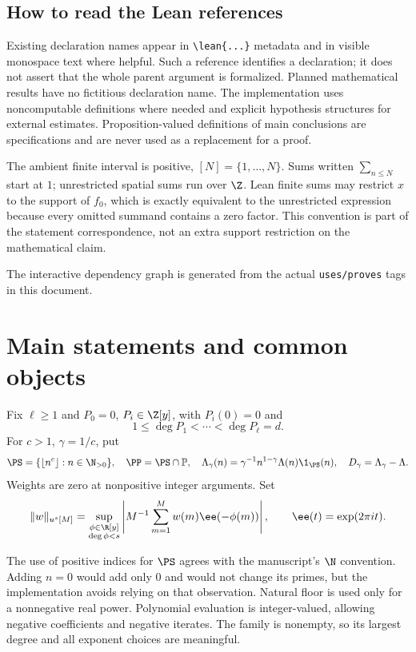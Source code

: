 \subsection*{How to read the Lean references}
Existing declaration names appear in \verb|\lean{...}| metadata and in visible monospace text where helpful. Such a reference identifies a declaration; it does not assert that the whole parent argument is formalized. Planned mathematical results have no fictitious declaration name. The implementation uses noncomputable definitions where needed and explicit hypothesis structures for external estimates. Proposition-valued definitions of main conclusions are specifications and are never used as a replacement for a proof.

The ambient finite interval is positive, $[N]=\{1,\ldots,N\}$. Sums written $\sum_{n\leq N}$ start at $1$; unrestricted spatial sums run over $\Z$. Lean finite sums may restrict $x$ to the support of $f_0$, which is exactly equivalent to the unrestricted expression because every omitted summand contains a zero factor. This convention is part of the statement correspondence, not an extra support restriction on the mathematical claim.
\fi

\ifdefined\WebVersion
The interactive dependency graph is generated from the actual \texttt{uses/proves} tags in this document.\else\fi

\section{Main statements and common objects}
\begin{definition}\label{def:objects}
Fix $\ell\geq1$ and $P_0=0$, $P_i\in\Z[y]$, with $P_i(0)=0$ and
\[
 1\leq\deg P_1<\cdots<\deg P_\ell=d.
\]
For $c>1$, $\gamma=1/c$, put
\[
 \PS=\{\lfloor n^c\rfloor:n\in\N_{>0}\},\quad
 \PP=\PS\cap\mathbb P,\quad
 \Lambda_\gamma(n)=\gamma^{-1}n^{1-\gamma}\Lambda(n)\1_{\PS}(n),\quad
 D_\gamma=\Lambda_\gamma-\Lambda.
\]
Weights are zero at nonpositive integer arguments. Set
\[
 \|w\|_{u^s[M]}=
 \sup_{\substack{\phi\in\R[y]\\\deg\phi<s}}
 \left|M^{-1}\sum_{m=1}^M w(m)\ee(-\phi(m))\right|,
 \qquad\ee(t)=\exp(2\pi it).
\]
\end{definition}
\ifDetailed
The use of positive indices for $\PS$ agrees with the manuscript's $\N$ convention. Adding $n=0$ would add only $0$ and would not change its primes, but the implementation avoids relying on that observation. Natural floor is used only for a nonnegative real power. Polynomial evaluation is integer-valued, allowing negative coefficients and negative iterates. The family is nonempty, so its largest degree and all exponent choices are meaningful.

